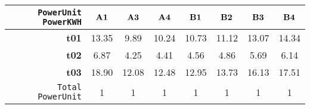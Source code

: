 \begin{tabular}{r|ccccccc}\cline{2-8}
\tt PowerUnit PowerKWH&$\bf A1$&$\bf A3$&$\bf A4$&$\bf B1$&$\bf B2$&$\bf B3$&$\bf B4$\\\hline
\bf t01& 13.35& 9.89& 10.24& 10.73& 11.12& 13.07& 14.34\\
\bf t02& 6.87& 4.25& 4.41& 4.56& 4.86& 5.69& 6.14\\
\bf t03& 18.90& 12.08& 12.48& 12.95& 13.73& 16.13& 17.51\\
\hline
\tt Total PowerUnit& 1& 1& 1& 1& 1& 1& 1\\
\end{tabular}
